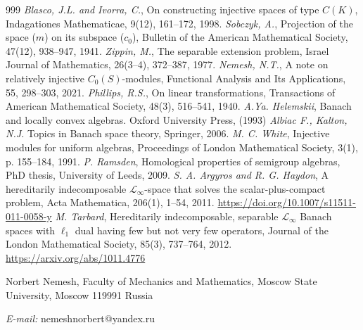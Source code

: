 \documentclass[12pt]{article}
\begin{document}
\begin{thebibliography}{999}
    \textit{Blasco, J.L. and Ivorra, C.}, On constructing injective spaces of
    type $C(K)$, Indagationes Mathematicae, 9(12), 161--172, 1998.
    \textit{Sobczyk, A.}, Projection of the space ($m$) on its subspace ($c_0$),
    Bulletin of the American Mathematical Society, 47(12), 938--947, 1941.
    \textit{Zippin, M.}, The separable extension problem, Israel Journal of
    Mathematics, 26(3--4), 372--387, 1977.
    \textit{Nemesh, N.T.}, A note on relatively injective $C_0(S)$-modules, 
    Functional Analysis and Its Applications, 55, 298--303, 2021.
    \textit{Phillips, R.S.}, On linear transformations,
    Transactions of American Mathematical Society, 48(3), 516--541, 1940.
    \textit{A.Ya. Helemskii}, Banach and locally convex algebras. Oxford
    University Press, (1993)
    \textit{Albiac F., Kalton, N.J.} Topics in Banach space theory, 
    Springer, 2006.
    \textit{M. C. White}, Injective modules for uniform 
    algebras, Proceedings of London Mathematical Society, 3(1), p. 155--184, 
    1991.
    \textit{P. Ramsden}, Homological properties of 
    semigroup algebras, PhD thesis, University of Leeds, 2009.
    \textit{S. A. Argyros and R. G. Haydon}, A 
    hereditarily indecomposable $\mathcal{L}_\infty$-space that solves the 
    scalar-plus-compact problem, Acta Mathematica, 206(1), 1--54, 2011. 
    \url{https://doi.org/10.1007/s11511-011-0058-y}
    \textit{M. Tarbard}, Hereditarily indecomposable, separable 
    $\mathcal{L}_\infty$ Banach spaces with $\ell_1$ dual having few but not very 
    few operators, Journal of the London Mathematical Society, 85(3), 737--764, 
    2012. \url{https://arxiv.org/abs/1011.4776}

\end{thebibliography}

Norbert Nemesh, Faculty of Mechanics and Mathematics, Moscow State University,
Moscow 119991 Russia

\textit{E-mail:} nemeshnorbert@yandex.ru
\end{document}
